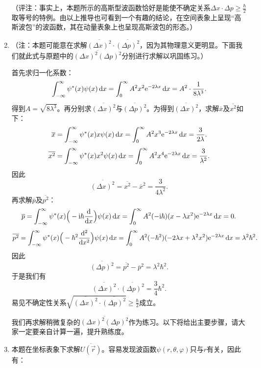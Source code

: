 \begin{enumerate}[label=2.\arabic*, leftmargin=-0.5mm]
（评注：事实上，本题所示的高斯型波函数恰好是能使不确定关系$\Delta x\cdot\Delta p\geq\frac{\hbar}{2}$取等号的特例。由以上推导也可看到一个有趣的结论，在空间表象上呈现“高斯波包”的波函数，其在动量表象上也呈现高斯波包的形态。）

\item
（注：本题可能意在求解$\overline{(\Delta x)^2}\cdot\overline{(\Delta p)^2}$，因为其物理意义更明显。下面我们就此式与原题中的$\overline{(\Delta x)^2(\Delta p)^2}$分别进行求解以巩固练习。）

首先求归一化系数：
\[\int_{-\infty}^\infty \psi^*(x)\psi(x)\dd{x} = \int_{0}^\infty A^2 x^2 \mathrm{e}^{-2\lambda x}\dd{x} = A^2\cdot \frac{1}{8\lambda^3}.\]
得到$A = \sqrt{8\lambda^3}$。再分别求$\overline{(\Delta x)^2}$与$\overline{(\Delta p)^2}$。为得到$\overline{(\Delta x)^2}$，求解$\overline{x}$及$\overline{x^2}$如下：
\[\overline{x} = \int_{-\infty}^\infty \psi^*(x)x\psi(x)\dd{x} = \int_{0}^\infty A^2 x^3 \mathrm{e}^{-2\lambda x}\dd{x} = \frac{3}{2\lambda}. \]
\[\overline{x^2} = \int_{-\infty}^\infty \psi^*(x)x^2\psi(x)\dd{x} = \int_{0}^\infty A^2 x^4 \mathrm{e}^{-2\lambda x}\dd{x} = \frac{3}{\lambda^2}. \]
因此
\[\overline{(\Delta x)^2} = \overline{x^2}-\overline{x}^2 = \frac{3}{4\lambda^2}.\]
再求解$\overline{p}$及$\overline{p^2}$：
\[\overline{p} = \int_{-\infty}^\infty \psi^*(x)\Big(-\mathrm{i}\hbar \dv{x}\Big)\psi(x)\dd{x} = \int_{0}^\infty A^2 (-\mathrm{i}\hbar)(x-\lambda x^2)\mathrm{e}^{-2\lambda x}\dd{x} = 0. \]
\[\overline{p^2} = \int_{-\infty}^\infty \psi^*(x)\Big(-\hbar^2 \dv[2]{x}\Big)\psi(x)\dd{x} = \int_{0}^\infty A^2 (-\hbar^2)(-2\lambda x+\lambda^2 x^2)\mathrm{e}^{-2\lambda x}\dd{x} = \lambda^2\hbar^2. \]
因此
\[\overline{(\Delta p)^2} = \overline{p^2}-\overline{p}^2 = \lambda^2 \hbar^2.\]
于是我们有
\[\overline{(\Delta x)^2}\cdot\overline{(\Delta p)^2} = \frac{3}{4}\hbar^2.\]
易见不确定性关系$\sqrt{\overline{(\Delta x)^2}\cdot\overline{(\Delta p)^2}} \geq \frac{\hbar}{2}$成立。

我们再求解稍微复杂的$\overline{(\Delta x)^2(\Delta p)^2}$作为练习。以下将给出主要步骤，请大家一定要亲自计算一遍，提升熟练度。

\item
本题在坐标表象下求解$\overline{U(\vec{r})}$。容易发现波函数$\psi(r,\theta,\varphi)$只与$r$有关，因此有：


\end{enumerate}
